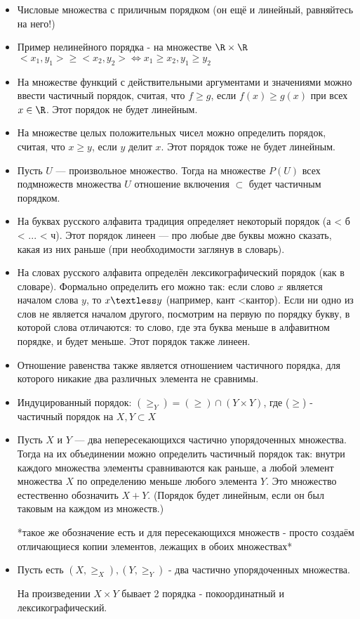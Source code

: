 \begin{itemize}
	\item
		Числовые множества с приличным порядком (он ещё и линейный, равняйтесь на него!)
	\item
		Пример нелинейного порядка - на множестве $\R \times \R$ $<x_1, y_1> \geq <x_2, y_2> \iff x_1 \geq x_2, y_1 \geq y_2$
	\item
		На множестве функций с действительными аргументами и значениями можно ввести частичный порядок, считая, что $f \geq g$,
		 если $f(x) \geq g(x)$ при всех $x \in \R$. Этот порядок не будет линейным.
	\item
		На множестве целых положительных чисел можно определить порядок, считая, что $x \geq y$, если $y$ делит $x$. Этот порядок тоже не будет линейным.
	\item
		Пусть $U$ — произвольное множество. Тогда на множестве $P(U)$ всех подмножеств множества $U$ отношение включения $\subset$ будет частичным порядком.
	\item
		На буквах русского алфавита традиция определяет некоторый порядок (а < б < ... < ч). Этот порядок линеен — про любые две буквы можно сказать, какая из них раньше (при необходимости заглянув в словарь).
	\item
		На словах русского алфавита определён лексикографический порядок (как в словаре). Формально определить его можно так: если слово $x$ является началом слова $y$, то $x \textless y$ (например, кант \textless кантор). Если ни одно из слов не является началом другого, посмотрим на первую по порядку букву, в которой слова отличаются: то слово, где эта буква меньше в алфавитном порядке, и будет меньше. Этот порядок также линеен.
	\item
		Отношение равенства также является отношением частичного порядка, для которого никакие два различных элемента не сравнимы.
\end{itemize}


\begin{itemize}
	\item
		Индуцированный порядок: $(\geq_Y) = (\geq) \cap (Y \times Y)$, где ($\geq$) - частичный порядок на $X, Y \subset X$
	\item
		Пусть $X$ и $Y$ — два непересекающихся частично упорядоченных множества. Тогда на их объединении можно определить 
		частичный порядок так: внутри каждого множества элементы сравниваются как раньше, а любой элемент множества $X$ по 
		определению меньше любого элемента $Y$. Это множество естественно обозначить $X + Y$.
		(Порядок будет линейным, если он был таковым на каждом из множеств.)
		
		*такое же обозначение есть и для пересекающихся множеств - просто создаём отличающиеся копии элементов, лежащих в обоих множествах*
	\item
		Пусть есть $(X, \geq_X), (Y, \geq_Y)$ - два частично упорядоченных множества.
		
		На произведении $X \times Y$ бывает 2 порядка - покоординатный и лексикографический. 
\end{itemize}

